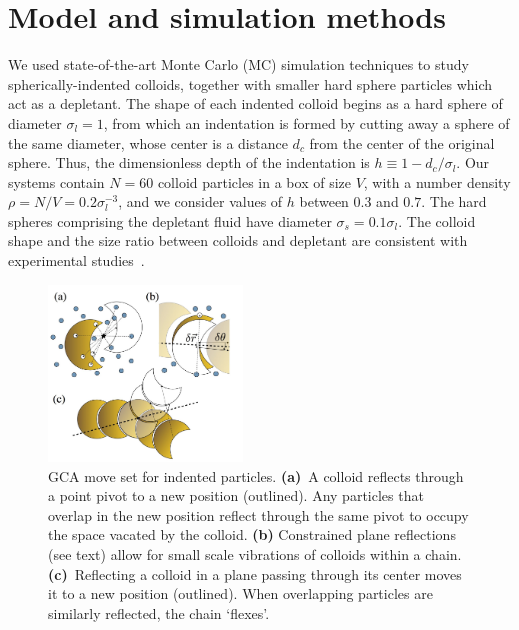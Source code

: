 \documentclass[8.5pt,oneside,onecolumn]{article}
\newcommand{\figurewidth}{0.46\textwidth}
\begin{document}
\section{Model and simulation methods} \label{sec:simdetails}

We used state-of-the-art Monte Carlo (MC) simulation
techniques to study spherically-indented colloids, together with
smaller hard sphere particles which act as a depletant.  The shape of
each indented colloid begins as a hard sphere of diameter
$\sigma_l=1$, from which an indentation is formed by cutting away a
sphere of the same diameter, whose center is a distance $d_c$ from the
center of the original sphere.  Thus, the dimensionless depth of the
indentation is $h\equiv 1 - d_c/\sigma_l$. Our systems contain $N=60$
colloid particles in a box of size $V$, with a number density
$\rho=N/V=0.2\sigma_l^{-3}$, and we consider values of $h$ between
$0.3$ and $0.7$.  The hard spheres comprising the depletant fluid have
diameter $\sigma_s=0.1\sigma_l$.  The colloid shape and the size ratio
between colloids and depletant are consistent with experimental
studies~\cite{Sacanna:2010ys}.

\begin{figure} 
\includegraphics[width=\figurewidth]{Fig2.jpg}
%
  \caption{GCA move set for indented particles. {\bf (a)}~A
    colloid reflects through a point pivot to a new position
    (outlined). Any particles that overlap in the new position reflect
    through the same pivot to occupy the space vacated by the
    colloid. {\bf (b)} Constrained plane reflections  (see text) 
    allow for small scale vibrations of colloids within a chain. {\bf (c)}~Reflecting a colloid
    in a plane passing through its center moves it to a new position (outlined). When overlapping particles are similarly reflected, the
     chain `flexes'.}
\label{fig:GCA}
\end{figure}
\end{document}
